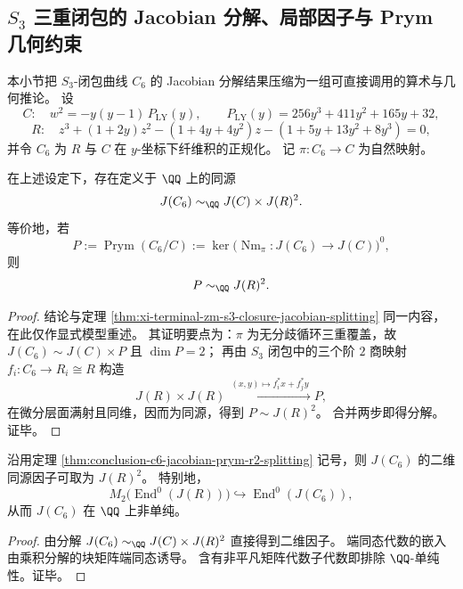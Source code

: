 \subsection{\texorpdfstring{$S_3$}{S3} 三重闭包的 Jacobian 分解、局部因子与 Prym 几何约束}\label{subsec:conclusion-c6-prym-r2-euler-ns-rigidity}
本小节把 \(S_3\)-闭包曲线 \(C_6\) 的 Jacobian 分解结果压缩为一组可直接调用的算术与几何推论。
设
\[
C:\quad w^2=-y(y-1)\,P_{\mathrm{LY}}(y),\qquad
P_{\mathrm{LY}}(y)=256y^3+411y^2+165y+32,
\]
\[
R:\quad
z^3+(1+2y)z^2-(1+4y+4y^2)z-(1+5y+13y^2+8y^3)=0,
\]
并令 \(C_6\) 为 \(R\) 与 \(C\) 在 \(y\)-坐标下纤维积的正规化。
记 \(\pi:C_6\to C\) 为自然映射。

\begin{theorem}\label{thm:conclusion-c6-jacobian-prym-r2-splitting}
在上述设定下，存在定义于 \(\QQ\) 上的同源
\[
J(C_6)\sim_{\QQ}J(C)\times J(R)^2.
\]
等价地，若
\[
P:=\operatorname{Prym}(C_6/C):=\ker\!\bigl(\operatorname{Nm}_{\pi}:J(C_6)\to J(C)\bigr)^0,
\]
则
\[
P\sim_{\QQ}J(R)^2.
\]
\end{theorem}
\begin{proof}
结论与定理 \ref{thm:xi-terminal-zm-s3-closure-jacobian-splitting} 同一内容，在此仅作显式模型重述。
其证明要点为：\(\pi\) 为无分歧循环三重覆盖，故 \(J(C_6)\sim J(C)\times P\) 且 \(\dim P=2\)；
再由 \(S_3\) 闭包中的三个阶 \(2\) 商映射 \(f_i:C_6\to R_i\cong R\) 构造
\[
J(R)\times J(R)\xrightarrow{\ (x,y)\mapsto f_i^\ast x+f_j^\ast y\ }P,
\]
在微分层面满射且同维，因而为同源，得到 \(P\sim J(R)^2\)。
合并两步即得分解。证毕。
\end{proof}

\begin{corollary}[二维因子的可见化与非单纯性]\label{cor:conclusion-c6-jacobian-not-simple}
沿用定理 \ref{thm:conclusion-c6-jacobian-prym-r2-splitting} 记号，则 \(J(C_6)\) 的二维同源因子可取为 \(J(R)^2\)。
特别地，
\[
M_2\!\bigl(\operatorname{End}^0(J(R))\bigr)
\hookrightarrow
\operatorname{End}^0(J(C_6)),
\]
从而 \(J(C_6)\) 在 \(\QQ\) 上非单纯。
\end{corollary}
\begin{proof}
由分解
\(
J(C_6)\sim_{\QQ}J(C)\times J(R)^2
\)
直接得到二维因子。
端同态代数的嵌入由乘积分解的块矩阵端同态诱导。
含有非平凡矩阵代数子代数即排除 \(\QQ\)-单纯性。证毕。
\end{proof}

